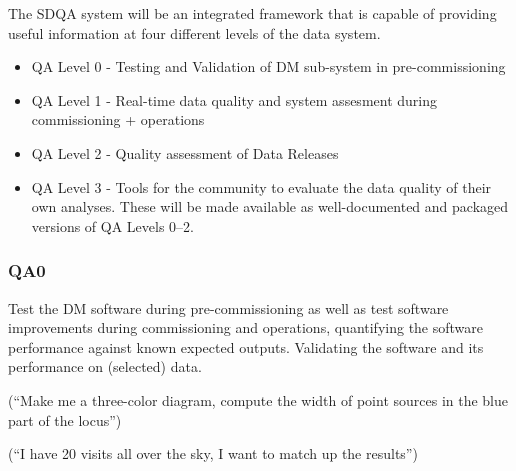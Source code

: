 The SDQA system will be an integrated framework that is capable of providing useful information at four different levels of the data system.

\begin{itemize}
\item QA Level 0 - Testing and Validation of DM sub-system in pre-commissioning
\item QA Level 1 - Real-time data quality and system assesment during commissioning + operations
\item QA Level 2 - Quality assessment of Data Releases
\item QA Level 3 - Tools for the community to evaluate the data quality of their own analyses.
  These will be made available as well-documented and packaged versions of QA Levels 0--2.
\end{itemize}

\subsubsection{QA0}

Test the DM software during pre-commissioning as well as test software improvements during commissioning and operations, quantifying the software performance against known expected outputs.
Validating the software and its performance on (selected) data.

(“Make me a three-color diagram, compute the width of point sources in the blue part of the locus”)

(“I have 20 visits all over the sky, I want to match up the results”)

